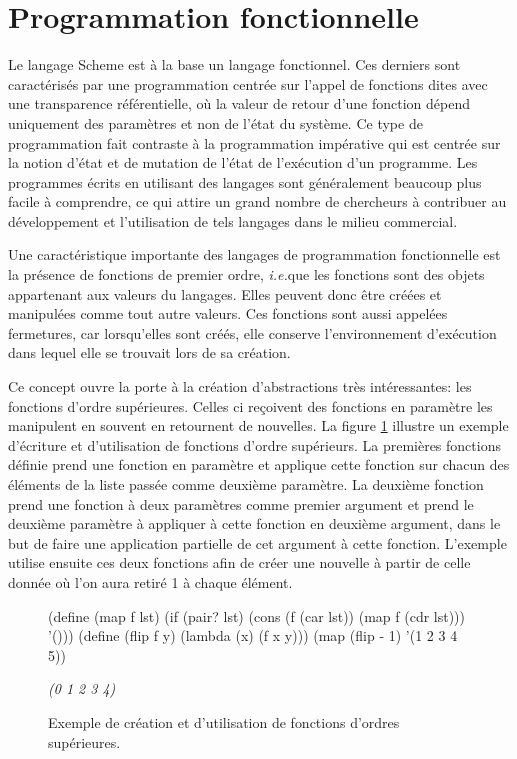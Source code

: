 \documentclass[12pt,oneside,letterpaper,francais]{book}
\newcommand{\ie}{{\textit{i.e.}}}
\newcommand{\schemeresult}[1]{{\it #1}}
\begin{document}
\section{Programmation fonctionnelle}
Le langage Scheme est à la base un langage fonctionnel. Ces derniers
sont caractérisés par une programmation centrée sur l'appel de
fonctions dites avec une transparence référentielle, où la valeur de
retour d'une fonction dépend uniquement des paramètres et non de
l'état du système. Ce type de programmation fait contraste à la
programmation impérative qui est centrée sur la notion d'état et de
mutation de l'état de l'exécution d'un programme. Les programmes
écrits en utilisant des langages sont généralement beaucoup plus
facile à comprendre, ce qui attire un grand nombre de chercheurs à
contribuer au développement et l'utilisation de tels langages dans le
milieu commercial. 

Une caractéristique importante des langages de programmation
fonctionnelle est la présence de fonctions de premier ordre, \ie que
les fonctions sont des objets appartenant aux valeurs du
langages. Elles peuvent donc être créées et manipulées comme tout
autre valeurs. Ces fonctions sont aussi appelées fermetures, car
lorsqu'elles sont créés, elle conserve l'environnement d'exécution
dans lequel elle se trouvait lors de sa création. 

Ce concept ouvre la porte à la création d'abstractions très
intéressantes: les fonctions d'ordre supérieures. Celles ci reçoivent
des fonctions en paramètre les manipulent en souvent en retournent de
nouvelles. La figure \ref{FIG:hof} illustre un exemple d'écriture et
d'utilisation de fonctions d'ordre supérieurs. La premières fonctions
définie prend une fonction en paramètre et applique cette fonction sur
chacun des éléments de la liste passée comme deuxième paramètre. La
deuxième fonction prend une fonction à deux paramètres comme premier
argument et prend le deuxième paramètre à appliquer à cette fonction
en deuxième argument, dans le but de faire une application partielle
de cet argument à cette fonction. L'exemple utilise ensuite ces deux
fonctions afin de créer une nouvelle à partir de celle donnée où l'on
aura retiré 1 à chaque élément.\\

\begin{figure}[htb!]
  \begin{schemecode}
(define (map f lst)
    (if (pair? lst)
        (cons (f (car lst)) (map f (cdr lst)))
        '()))
(define (flip f y)
    (lambda (x) (f x y)))
(map (flip - 1) '(1 2 3 4 5))
  \end{schemecode}
  \schemeresult{(0 1 2 3 4)}
  \caption{Exemple de création et d'utilisation de fonctions d'ordres
    supérieures.}
  \label{FIG:hof}
\end{figure}
\end{document}
